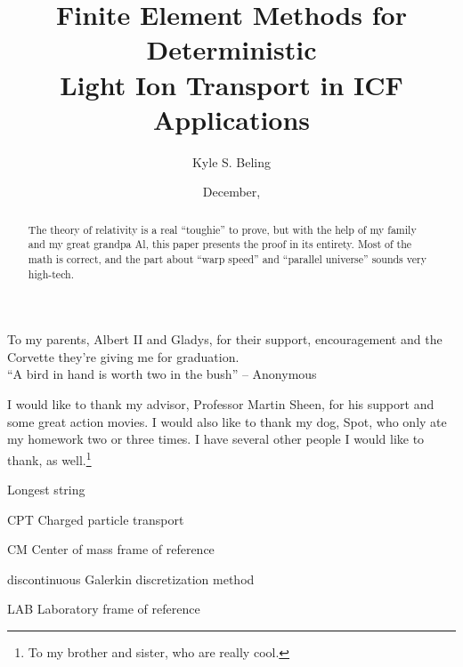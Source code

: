 \title{Finite Element Methods for Deterministic
    \\ Light Ion Transport in ICF Applications}

\author{Kyle S. Beling}





\date{December, \thisyear}

\maketitle

\begin{dedication}
  To my parents, Albert II and Gladys, for their support,
  encouragement and the Corvette they're giving me for graduation. \\[3ex]
  ``A bird in hand is worth two in the bush''
        -- Anonymous
\end{dedication}

\begin{acknowledgments}
    \vspace{1.1in}
    I would like to thank my advisor, Professor Martin Sheen, for his support
    and some great action movies.  I would also like to thank my dog, Spot,
    who only ate my homework two or three times.  I have several other people
    I would like to thank, as well.\footnote{To my brother and sister, who
    are really cool.}
\end{acknowledgments}

\maketitleabstract %

\begin{abstract}
    The theory of relativity is a real ``toughie'' to prove, but with the
    help of my family and my great grandpa Al, this paper presents the
    proof in its entirety.  Most of the math is correct, and the
    part about ``warp speed'' and ``parallel universe'' sounds very high-tech.
\clearpage %
\end{abstract}

\tableofcontents
\listoffigures
\listoftables

\begin{glossary}{Longest  string}
  \item[CPT] Charged particle transport
  \item[CM]  Center of mass frame of reference
  \item[\dG] discontinuous Galerkin discretization method
  \item[LAB] Laboratory frame of reference
\end{glossary}